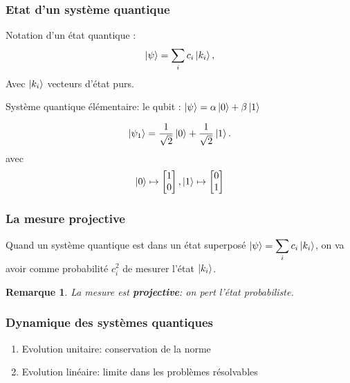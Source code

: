 \documentclass{beamer}
\newtheorem{rem}{Remarque}
\begin{document}
\begin{frame}
\frametitle{Etat d'un système quantique}

\begin{definition}
  Notation d'un état quantique :
\begin{equation}
    \ket{\psi} = \displaystyle\sum_{i} c_i \ket{k_i},
\end{equation}
Avec $\ket{k_i}$ vecteurs d'état purs.
\end{definition}

% 

Système quantique élémentaire: le qubit : $\ket{\psi} = \alpha \ket{0} + \beta \ket{1}$

\begin{example}
\begin{equation}
  \ket{\psi_1} = \frac{1}{\sqrt{2}} \ket{0} + \frac{1}{\sqrt{2}} \ket{1}.
\end{equation}
avec
\begin{equation}
  \ket{0} \mapsto \begin{bmatrix}
    1 \\ 0
  \end{bmatrix}
  ,
  \ket{1} \mapsto \begin{bmatrix}
    0 \\ 1
  \end{bmatrix}
\end{equation}
\end{example}

\end{frame}

\begin{frame}
\frametitle{La mesure projective}
\begin{definition}
  Quand un système quantique est dans un état superposé $\ket{\psi} = \displaystyle\sum_{i} c_i \ket{k_i}$, on va avoir comme probabilité $c_i^2$ de mesurer l'état $\ket{k_i}$.
\end{definition}

\begin{rem}
  La mesure est \textbf{projective}: on pert l'état probabiliste.
\end{rem}
\end{frame}



\begin{frame}
\frametitle{Dynamique des systèmes quantiques}
\begin{enumerate}
  \item Evolution unitaire: conservation de la norme
  \item Evolution linéaire: limite dans les problèmes résolvables
\end{enumerate}
\end{frame}
\end{document}
